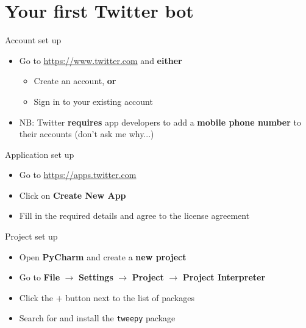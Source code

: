 \part{Your first Twitter bot}
\frame{\partpage}

\begin{frame}{Account set up}
    \begin{itemize}
        \item Go to \url{https://www.twitter.com} and \textbf{either}
            \begin{itemize}
                \item Create an account, \textbf{or}
                \item Sign in to your existing account
            \end{itemize}
        \item NB: Twitter \textbf{requires} app developers to add a \textbf{mobile phone number} to their accounts
            (don't ask me why...)
    \end{itemize}
\end{frame}

\begin{frame}{Application set up}
    \begin{itemize}
        \item Go to \url{https://apps.twitter.com}
        \item Click on \textbf{Create New App}
        \item Fill in the required details and agree to the license agreement
    \end{itemize}
\end{frame}

\begin{frame}{Project set up}
    \begin{itemize}
        \item Open \textbf{PyCharm} and create a \textbf{new project}
        \item Go to \textbf{File} $\to$ \textbf{Settings} $\to$ \textbf{Project} $\to$ \textbf{Project Interpreter}
        \item Click the $+$ button next to the list of packages
        \item Search for and install the \texttt{tweepy} package
    \end{itemize}
\end{frame}

